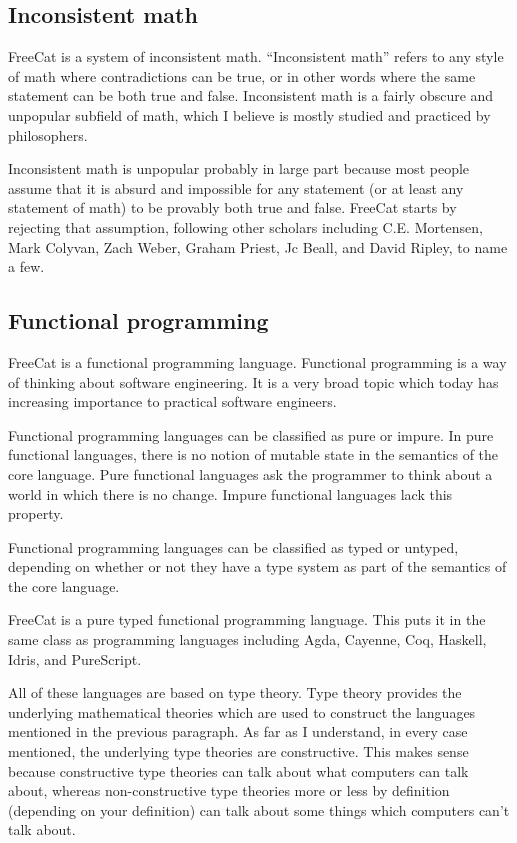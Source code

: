 \documentclass{article}
\begin{document}
\subsection{Inconsistent math}

FreeCat is a system of inconsistent math. ``Inconsistent math'' refers to any style of math where contradictions can be true, or in other words where the same statement can be both true and false. Inconsistent math is a fairly obscure and unpopular subfield of math, which I believe is mostly studied and practiced by philosophers.

Inconsistent math is unpopular probably in large part because most people assume that it is absurd and impossible for any statement (or at least any statement of math) to be provably both true and false. FreeCat starts by rejecting that assumption, following other scholars including C.E. Mortensen, Mark Colyvan, Zach Weber, Graham Priest, Jc Beall, and David Ripley, to name a few.

\subsection{Functional programming}

FreeCat is a functional programming language. Functional programming is a way of thinking about software engineering. It is a very broad topic which today has increasing importance to practical software engineers.

Functional programming languages can be classified as pure or impure. In pure functional languages, there is no notion of mutable state in the semantics of the core language. Pure functional languages ask the programmer to think about a world in which there is no change. Impure functional languages lack this property.

Functional programming languages can be classified as typed or untyped, depending on whether or not they have a type system as part of the semantics of the core language.

FreeCat is a pure typed functional programming language. This puts it in the same class as programming languages including Agda, Cayenne, Coq, Haskell, Idris, and PureScript.

All of these languages are based on type theory. Type theory provides the underlying mathematical theories which are used to construct the languages mentioned in the previous paragraph. As far as I understand, in every case mentioned, the underlying type theories are constructive. This makes sense because constructive type theories can talk about what computers can talk about, whereas non-constructive type theories more or less by definition (depending on your definition) can talk about some things which computers can't talk about.
\end{document}
